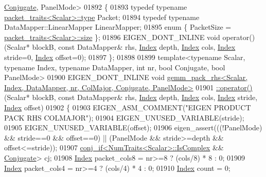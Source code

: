 \begin{DoxyCode}
      \hyperlink{class_eigen_1_1_conjugate}{Conjugate}, PanelMode>
01892 \{
01893   \textcolor{keyword}{typedef} \textcolor{keyword}{typename} \hyperlink{struct_eigen_1_1internal_1_1packet__traits}{packet\_traits<Scalar>::type} Packet;
01894   \textcolor{keyword}{typedef} \textcolor{keyword}{typename} DataMapper::LinearMapper LinearMapper;
01895   \textcolor{keyword}{enum} \{ PacketSize = \hyperlink{struct_eigen_1_1internal_1_1packet__traits}{packet\_traits<Scalar>::size} \};
01896   EIGEN\_DONT\_INLINE \textcolor{keywordtype}{void} operator()(Scalar* blockB, \textcolor{keyword}{const} DataMapper& rhs, \hyperlink{namespace_eigen_a62e77e0933482dafde8fe197d9a2cfde}{Index} depth, 
      \hyperlink{namespace_eigen_a62e77e0933482dafde8fe197d9a2cfde}{Index} cols, \hyperlink{namespace_eigen_a62e77e0933482dafde8fe197d9a2cfde}{Index} stride=0, \hyperlink{namespace_eigen_a62e77e0933482dafde8fe197d9a2cfde}{Index} offset=0);
01897 \};
01898 
01899 \textcolor{keyword}{template}<\textcolor{keyword}{typename} Scalar, \textcolor{keyword}{typename} Index, \textcolor{keyword}{typename} DataMapper, \textcolor{keywordtype}{int} nr, \textcolor{keywordtype}{bool} Conjugate, \textcolor{keywordtype}{bool} PanelMode>
01900 EIGEN\_DONT\_INLINE \textcolor{keywordtype}{void} 
      \hyperlink{struct_eigen_1_1internal_1_1gemm__pack__rhs}{gemm\_pack\_rhs<Scalar, Index, DataMapper, nr, ColMajor, Conjugate, PanelMode>}
01901 \hyperlink{struct_eigen_1_1internal_1_1gemm__pack__rhs}{  ::operator()}(Scalar* blockB, \textcolor{keyword}{const} DataMapper& rhs, \hyperlink{namespace_eigen_a62e77e0933482dafde8fe197d9a2cfde}{Index} depth, 
      \hyperlink{namespace_eigen_a62e77e0933482dafde8fe197d9a2cfde}{Index} cols, \hyperlink{namespace_eigen_a62e77e0933482dafde8fe197d9a2cfde}{Index} stride, \hyperlink{namespace_eigen_a62e77e0933482dafde8fe197d9a2cfde}{Index} offset)
01902 \{
01903   EIGEN\_ASM\_COMMENT(\textcolor{stringliteral}{"EIGEN PRODUCT PACK RHS COLMAJOR"});
01904   EIGEN\_UNUSED\_VARIABLE(stride);
01905   EIGEN\_UNUSED\_VARIABLE(offset);
01906   eigen\_assert(((!PanelMode) && stride==0 && offset==0) || (PanelMode && stride>=depth && offset<=stride));
01907   \hyperlink{struct_eigen_1_1internal_1_1conj__if}{conj\_if<NumTraits<Scalar>::IsComplex} && 
      \hyperlink{class_eigen_1_1_conjugate}{Conjugate}> cj;
01908   \hyperlink{namespace_eigen_a62e77e0933482dafde8fe197d9a2cfde}{Index} packet\_cols8 = nr>=8 ? (cols/8) * 8 : 0;
01909   \hyperlink{namespace_eigen_a62e77e0933482dafde8fe197d9a2cfde}{Index} packet\_cols4 = nr>=4 ? (cols/4) * 4 : 0;
01910   \hyperlink{namespace_eigen_a62e77e0933482dafde8fe197d9a2cfde}{Index} count = 0;

\end{DoxyCode}
